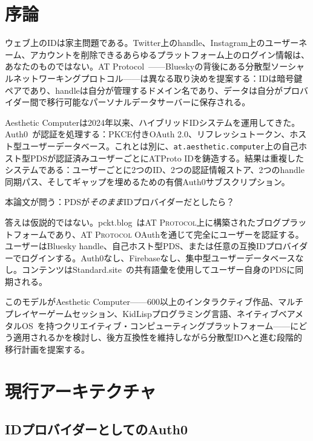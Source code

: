 \documentclass[10pt,letterpaper,twocolumn]{article}
\newcommand{\atproto}{\textsc{AT Protocol}}
\begin{document}

\section{序論}

ウェブ上のIDは家主問題である。Twitter上のhandle、Instagram上のユーザーネーム、アカウントを削除できるあらゆるプラットフォーム上のログイン情報は、あなたのものではない。AT Protocol~\citep{atproto2024spec}——Blueskyの背後にある分散型ソーシャルネットワーキングプロトコル——は異なる取り決めを提案する：IDは暗号鍵ペアであり、handleは自分が管理するドメイン名であり、データは自分がプロバイダー間で移行可能なパーソナルデータサーバーに保存される。

Aesthetic Computerは2024年以来、ハイブリッドIDシステムを運用してきた。Auth0~\citep{auth0spa}が認証を処理する：PKCE付きOAuth 2.0、リフレッシュトークン、ホスト型ユーザーデータベース。これとは別に、\texttt{at.aesthetic.computer}上の自己ホスト型PDSが認証済みユーザーごとにATProto IDを鋳造する。結果は重複したシステムである：ユーザーごとに2つのID、2つの認証情報ストア、2つのhandle同期パス、そしてギャップを埋めるための有償Auth0サブスクリプション。

本論文が問う：PDSが\emph{そのまま}IDプロバイダーだとしたら？

答えは仮説的ではない。pckt.blog~\citep{pcktblog2025}は\atproto{}上に構築されたブログプラットフォームであり、\atproto{} OAuthを通じて完全にユーザーを認証する。ユーザーはBluesky handle、自己ホスト型PDS、または任意の互換IDプロバイダーでログインする。Auth0なし、Firebaseなし、集中型ユーザーデータベースなし。コンテンツはStandard.site~\citep{standardsite2025}の共有語彙を使用してユーザー自身のPDSに同期される。

このモデルがAesthetic Computer——600以上のインタラクティブ作品、マルチプレイヤーゲームセッション、KidLispプログラミング言語、ネイティブベアメタルOS~\citep{scudder2026os}を持つクリエイティブ・コンピューティングプラットフォーム——にどう適用されるかを検討し、後方互換性を維持しながら分散型IDへと進む段階的移行計画を提案する。


\section{現行アーキテクチャ}
\label{sec:current}

\subsection{IDプロバイダーとしてのAuth0}
\end{document}
